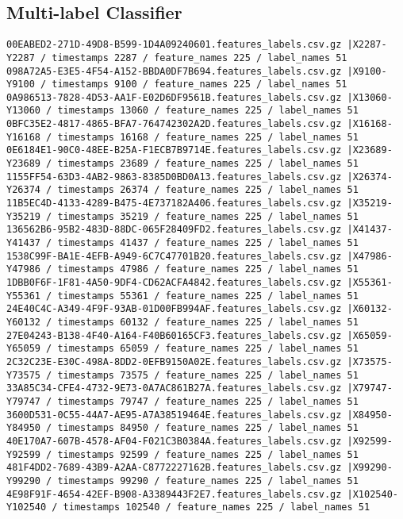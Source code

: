 \documentclass{UoNMCHA}
\numberwithin{equation}{section}
\begin{document}
\subsection{Multi-label Classifier}
\begin{lstlisting}
00EABED2-271D-49D8-B599-1D4A09240601.features_labels.csv.gz |X2287-Y2287 / timestamps 2287 / feature_names 225 / label_names 51
098A72A5-E3E5-4F54-A152-BBDA0DF7B694.features_labels.csv.gz |X9100-Y9100 / timestamps 9100 / feature_names 225 / label_names 51
0A986513-7828-4D53-AA1F-E02D6DF9561B.features_labels.csv.gz |X13060-Y13060 / timestamps 13060 / feature_names 225 / label_names 51
0BFC35E2-4817-4865-BFA7-764742302A2D.features_labels.csv.gz |X16168-Y16168 / timestamps 16168 / feature_names 225 / label_names 51
0E6184E1-90C0-48EE-B25A-F1ECB7B9714E.features_labels.csv.gz |X23689-Y23689 / timestamps 23689 / feature_names 225 / label_names 51
1155FF54-63D3-4AB2-9863-8385D0BD0A13.features_labels.csv.gz |X26374-Y26374 / timestamps 26374 / feature_names 225 / label_names 51
11B5EC4D-4133-4289-B475-4E737182A406.features_labels.csv.gz |X35219-Y35219 / timestamps 35219 / feature_names 225 / label_names 51
136562B6-95B2-483D-88DC-065F28409FD2.features_labels.csv.gz |X41437-Y41437 / timestamps 41437 / feature_names 225 / label_names 51
1538C99F-BA1E-4EFB-A949-6C7C47701B20.features_labels.csv.gz |X47986-Y47986 / timestamps 47986 / feature_names 225 / label_names 51
1DBB0F6F-1F81-4A50-9DF4-CD62ACFA4842.features_labels.csv.gz |X55361-Y55361 / timestamps 55361 / feature_names 225 / label_names 51
24E40C4C-A349-4F9F-93AB-01D00FB994AF.features_labels.csv.gz |X60132-Y60132 / timestamps 60132 / feature_names 225 / label_names 51
27E04243-B138-4F40-A164-F40B60165CF3.features_labels.csv.gz |X65059-Y65059 / timestamps 65059 / feature_names 225 / label_names 51
2C32C23E-E30C-498A-8DD2-0EFB9150A02E.features_labels.csv.gz |X73575-Y73575 / timestamps 73575 / feature_names 225 / label_names 51
33A85C34-CFE4-4732-9E73-0A7AC861B27A.features_labels.csv.gz |X79747-Y79747 / timestamps 79747 / feature_names 225 / label_names 51
3600D531-0C55-44A7-AE95-A7A38519464E.features_labels.csv.gz |X84950-Y84950 / timestamps 84950 / feature_names 225 / label_names 51
40E170A7-607B-4578-AF04-F021C3B0384A.features_labels.csv.gz |X92599-Y92599 / timestamps 92599 / feature_names 225 / label_names 51
481F4DD2-7689-43B9-A2AA-C8772227162B.features_labels.csv.gz |X99290-Y99290 / timestamps 99290 / feature_names 225 / label_names 51
4E98F91F-4654-42EF-B908-A3389443F2E7.features_labels.csv.gz |X102540-Y102540 / timestamps 102540 / feature_names 225 / label_names 51

\end{lstlisting}
\end{document}
